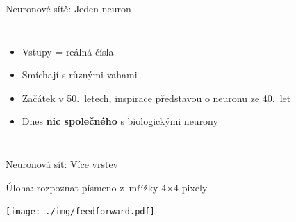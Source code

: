 \documentclass[handout,aspectratio=169,dvipsnames]{beamer}
\begin{document}

\begin{frame}{Neuronové sítě: Jeden neuron}

    \begin{columns}
        

        \begin{itemize}[<+->]

            \item Vstupy = reálná čísla

            \item Smíchají s různými vahami

            \item Začátek v 50.\ letech, inspirace představou o neuronu
                ze 40.\ let

            \item Dnes \textbf{nic společného} s biologickými neurony

        \end{itemize}

    \end{columns}

\end{frame}


\begin{frame}{Neuronová síť: Více vrstev}

    \centering
    Úloha: rozpoznat písmeno z~mřížky 4$\times$4 pixely

    \vspace{10pt}

    \texttt{[image: ./img/feedforward.pdf]}

\end{frame}

\end{document}
